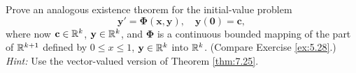 \begin{myExercise}
    \label{ex:7.26}
    Prove an analogous existence theorem for the initial-value problem
    \begin{equation*}
        \mathbf{y' = \Phi(x, y)}, \quad    \mathbf{y(0) = c},
    \end{equation*}
    where now $\mathbf{c} \in {\protect\mathbb R}^{k}$, $\mathbf{y} \in {\protect\mathbb R}^{k}$, and $\mathbf{\Phi}$ is a continuous bounded mapping of the part of ${\protect\mathbb R}^{k+1}$ defined by $0 \leq x \leq 1$, $\mathbf{y} \in {\protect\mathbb R}^k$ into ${\protect\mathbb R}^k$. 
    (Compare Exercise \ref{ex:5.28}.) 
    \emph{Hint:} Use the vector-valued version of Theorem \ref{thm:7.25}.
\end{myExercise}